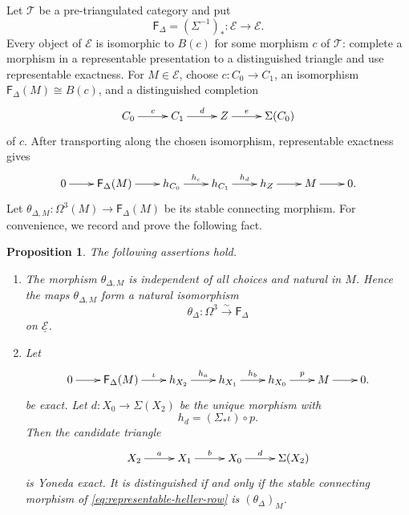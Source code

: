 \documentclass[a4paper,11pt,reqno]{amsart}
\newtheorem{proposition}[proposition]{Proposition}
\theoremstyle{definition}
\theoremstyle{plain}
\numberwithin{equation}{section}
\newcommand{\T}{\mathcal T}
\begin{document}
Let $\T$ be a pre-triangulated category and put
\[
 \mathsf F_\Delta=(\Sigma^{-1})_*:\mathcal E\longrightarrow\mathcal E.
\]
Every object of $\mathcal E$ is isomorphic to $B(c)$ for some morphism $c$
of $\T$: complete a morphism in a representable presentation to a
distinguished triangle and use representable exactness.  For
$M\in\mathcal E$, choose $c:C_0\to C_1$, an isomorphism
$\mathsf F_\Delta(M)\cong B(c)$, and a distinguished completion
\begin{equation*}
\xymatrix@C=2.2pc{
C_0\ar[r]^-{c}&C_1\ar[r]^-{d}&Z\ar[r]^-{e}&\Sigma(C_0)
}
\end{equation*}
of $c$.  After transporting along the chosen isomorphism, representable
exactness gives
\begin{equation}
\label{eq:intrinsic-heller-row}
\xymatrix@C=1.8pc{
0\ar[r]&\mathsf F_\Delta(M)\ar[r]&h_{C_0}\ar[r]^-{h_c}&h_{C_1}
\ar[r]^-{h_d}&h_Z\ar[r]&M\ar[r]&0.
}
\end{equation}
Let $\theta_{\Delta,M}:\Omega^3(M)\to\mathsf F_\Delta(M)$ be its stable
connecting morphism.  For convenience, we record and prove the following
fact.

\begin{proposition}
\label{prop:intrinsic-inverse-comparison}
The following assertions hold.
\begin{enumerate}[label=\textup{(\roman*)}]
 \item The morphism $\theta_{\Delta,M}$ is independent of all choices and
       natural in $M$.  Hence the maps $\theta_{\Delta,M}$ form a natural
       isomorphism
       \begin{equation}
       \label{eq:intrinsic-inverse-comparison}
        \theta_\Delta:\Omega^3\xrightarrow{\sim}\mathsf F_\Delta
       \end{equation}
       on $\underline{\mathcal E}$.
 \item Let
       \begin{equation}
\label{eq:representable-heller-row}
\xymatrix@C=1.8pc{
0\ar[r]&\mathsf F_\Delta(M)\ar[r]^-{\iota}&h_{X_2}\ar[r]^-{h_a}&
h_{X_1}\ar[r]^-{h_b}&h_{X_0}\ar[r]^-{p}&M\ar[r]&0.
}
\end{equation}
       be exact.  Let $d:X_0\to\Sigma(X_2)$ be the unique morphism with
       \[
        h_d=(\Sigma_*\iota)\circ p.
       \]
       Then the candidate triangle
       \begin{equation*}
\xymatrix@C=2.2pc{
X_2\ar[r]^-{a}&X_1\ar[r]^-{b}&X_0\ar[r]^-{d}&\Sigma(X_2)
}
\end{equation*}
       is Yoneda exact.  It is distinguished if and only if the stable
       connecting morphism of \eqref{eq:representable-heller-row} is
       $(\theta_\Delta)_M$.
\end{enumerate}
\end{proposition}
\end{document}
